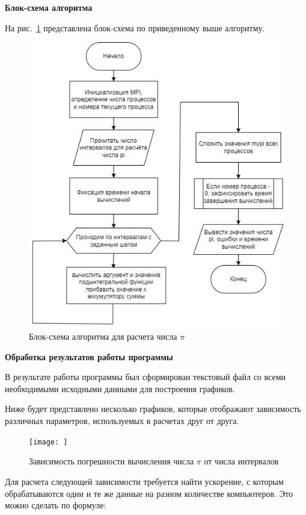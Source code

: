 \documentclass{altsu-bachelor}
\begin{document}
\textbf{Блок-схема алгоритма}

На рис.~\ref{fig:mpi} представлена блок-схема по приведенному выше алгоритму.

\begin{figure}[H]
    \centering
    \includegraphics[scale=0.8]{icpi_block.png}
    \caption{Блок-схема алгоритма для расчета числа $\pi$}
    \label{fig:mpi}
\end{figure}

\textbf{Обработка результатов работы программы}

В результате работы программы был сформирован текстовый файл со всеми необходимыми исходными данными для построения графиков.

Ниже будет представлено несколько графиков, которые отображают зависимость различных параметров, используемых в расчетах друг от друга.

\begin{figure}[H]
    \centering
    \texttt{[image: ]}
    \caption{Зависимость погрешности вычисления числа $\pi$ от числа интервалов}
    \label{fig:error}
\end{figure}

Для расчета следующей зависимости требуется найти ускорение, с которым обрабатываются одни и те же данные на разном количестве компьютеров. Это можно сделать по формуле:
\end{document}
